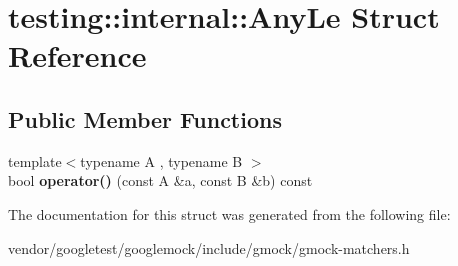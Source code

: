 \hypertarget{structtesting_1_1internal_1_1_any_le}{}\section{testing\+:\+:internal\+:\+:Any\+Le Struct Reference}
\label{structtesting_1_1internal_1_1_any_le}
\subsection*{Public Member Functions}
\begin{DoxyCompactItemize}
\item 
\mbox{\label{structtesting_1_1internal_1_1_any_le_aadb369f2ea23ba9889b06df4c8bc1b82}} 
{\footnotesize template$<$typename A , typename B $>$ }\\bool {\bfseries operator()} (const A \&a, const B \&b) const
\end{DoxyCompactItemize}


The documentation for this struct was generated from the following file\+:\begin{DoxyCompactItemize}
\item 
vendor/googletest/googlemock/include/gmock/gmock-\/matchers.\+h\end{DoxyCompactItemize}
